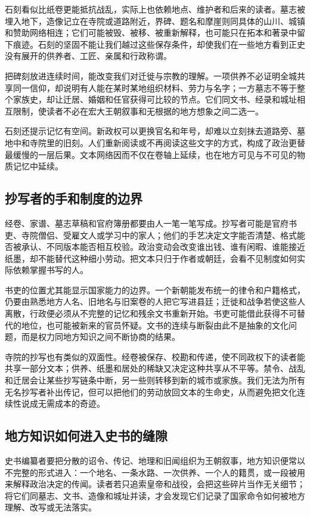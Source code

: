 石刻看似比纸卷更能抵抗战乱，实际上也依赖地点、维护者和后来的读者。墓志被埋入地下，造像记立在寺院或道路附近，界碑、题名和摩崖则同具体的山川、城镇和赞助网络相连；它们可能被毁、被移、被重新解释，也可能只在拓本和著录中留下痕迹。石刻的坚固不能让我们越过这些保存条件，却使我们在一些地方看到正史没有展开的供养者、工匠、亲属和行政称谓。

把碑刻放进连续时间，能改变我们对迁徙与宗教的理解。一项供养不必证明全城共享同一信仰，却说明有人能在某时某地组织材料、劳力与名字；一方墓志不等于整个家族史，却让迁居、婚姻和任官获得可比较的节点。它们同文书、经录和城址相互限制，使读者不必在宏大王朝叙事和无根据的地方想象之间二选一。

石刻还提示记忆有空间。新政权可以更换官名和年号，却难以立刻抹去道路旁、墓地中和寺院里的旧刻。人们重新阅读或不再阅读这些文字的方式，构成了政治更替最缓慢的一层后果。文本网络因而不仅在卷轴上延续，也在地方可见与不可见的物质记忆中延续。

\subsection{抄写者的手和制度的边界}

经卷、家谱、墓志草稿和官府簿册都要由人一笔一笔写成。抄写者可能是官府书吏、寺院僧侣、受雇文人或学习中的家人；他们的手艺决定文字能否清楚、格式能否被承认、不同版本能否相互校验。政治变动会改变谁出钱、谁有闲暇、谁能接近纸墨，却不能替代这种细小劳动。把文本只归于作者或朝廷，会看不见制度如何实际依赖掌握书写的人。

书吏的位置尤其能显示国家能力的边界。一个新朝能发布统一的律令和户籍格式，仍要由熟悉地方人名、旧地名与旧案卷的人把它写进县廷；迁徙和战争若使这些人离散，行政便必须从不完整的记忆和残余文书重新开始。书吏可能借此获得不可替代的地位，也可能被新来的官员怀疑。文书的连续与断裂由此不是抽象的文化问题，而是权力同地方知识之间不断协商的结果。

寺院的抄写也有类似的双面性。经卷被保存、校勘和传递，使不同政权下的读者能共享一部分文本；供养、纸墨和居处的稀缺又决定这种共享从不平等。禁令、战乱和迁居会让某些抄写链条中断，另一些则转移到新的城市或家族。我们无法为所有无名抄写者补出传记，但可以把他们的劳动放回文本的生命史，从而避免把文化连续性说成无需成本的奇迹。

\subsection{地方知识如何进入史书的缝隙}

史书编纂者要把分散的诏令、传记、地理和旧闻组织为王朝叙事，地方知识便常以不完整的形式进入：一个地名、一条水路、一次供养、一个人的籍贯，或一段被用来解释政治决定的传闻。读者若只追索皇帝和战役，会把这些碎片当作无关细节；将它们同墓志、文书、造像和城址并读，才会发现它们记录了国家命令如何被地方理解、改写或无法落实。

